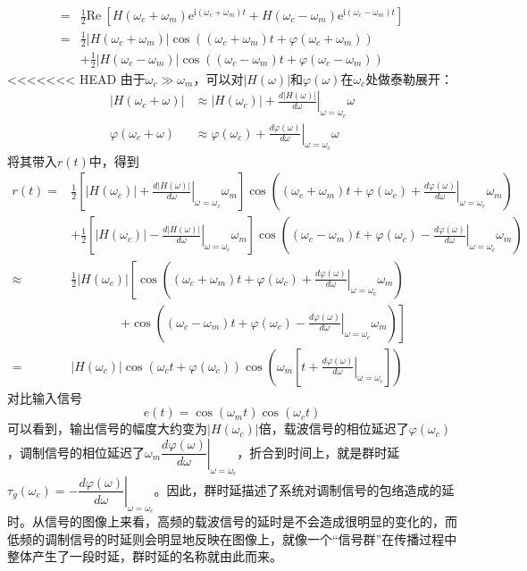 \begin{example}[群时延]
\begin{align*}
    =&\frac{1}{2}\text{Re}\ \left[H(\omega_c+\omega_m)\mathrm{e}^{\mathrm{i}(\omega_c+\omega_m)t}+H(\omega_c-\omega_m)\mathrm{e}^{\mathrm{i}(\omega_c-\omega_m)t}\right]\\
    =&\frac{1}{2}|H(\omega_c+\omega_m)|\cos((\omega_c+\omega_m)t+\varphi(\omega_c+\omega_m))\\
    &+\frac{1}{2}\left|H(\omega_c-\omega_m)\right|\cos\left((\omega_c-\omega_m)t+\varphi(\omega_c-\omega_m)\right)
\end{align*}
<<<<<<< HEAD
由于$\omega_c\gg \omega_m$，可以对$|H(\omega)|$和$\varphi(\omega)$在$\omega_c$处做泰勒展开：
\begin{align*}
    |H(\omega_c+\omega)|&\approx |H(\omega_c)|+\left.\frac{d|H(\omega)|}{d\omega}\right|_{\omega=\omega_c}\omega\\
    \varphi(\omega_c+ \omega)&\approx \varphi(\omega_c)+\left.\frac{d\varphi(\omega)}{d\omega}\right|_{\omega=\omega_c}\omega
\end{align*}
将其带入$r(t)$中，得到
\begin{align*}
    r(t)=&\frac{1}{2}\left[|H(\omega_c)|+\left.\frac{d|H(\omega)|}{d\omega}\right|_{\omega=\omega_c}\omega_m\right]\cos\left((\omega_c+\omega_m)t+\varphi(\omega_c)+\left.\frac{d\varphi(\omega)}{d\omega}\right|_{\omega=\omega_c}\omega_m\right)\\
    &+\frac{1}{2}\left[|H(\omega_c)|-\left.\frac{d|H(\omega)|}{d\omega}\right|_{\omega=\omega_c}\omega_m\right]\cos\left((\omega_c-\omega_m)t+\varphi(\omega_c)-\left.\frac{d\varphi(\omega)}{d\omega}\right|_{\omega=\omega_c}\omega_m\right)\\
    \approx&\frac{1}{2}|H(\omega_c)|\left[\cos\left((\omega_c+\omega_m)t+\varphi(\omega_c)+\left.\frac{d\varphi(\omega)}{d\omega}\right|_{\omega=\omega_c}\omega_m\right)\right.\\
    &\qquad\qquad\left.+\cos\left((\omega_c-\omega_m)t+\varphi(\omega_c)-\left.\frac{d\varphi(\omega)}{d\omega}\right|_{\omega=\omega_c}\omega_m\right)\right]\\
    =&|H(\omega_c)|\cos(\omega_c t+\varphi(\omega_c))\cos\left(\omega_m\left[t+\left.\frac{d\varphi(\omega)}{d\omega}\right|_{\omega=\omega_c}\right]\right)
\end{align*}
对比输入信号
\[e(t)=\cos(\omega_m t)\cos(\omega_c t)\]
可以看到，输出信号的幅度大约变为$|H(\omega_c)|$倍，载波信号的相位延迟了$\varphi(\omega_c)$，调制信号的相位延迟了$\omega_m\left.\dfrac{d\varphi(\omega)}{d\omega}\right|_{\omega=\omega_c}$，折合到时间上，就是群时延$\tau_g(\omega_c)=-\left.\dfrac{d\varphi(\omega)}{d\omega}\right|_{\omega=\omega_c}$。因此，群时延描述了系统对调制信号的包络造成的延时。从信号的图像上来看，高频的载波信号的延时是不会造成很明显的变化的，而低频的调制信号的时延则会明显地反映在图像上，就像一个“信号群”在传播过程中整体产生了一段时延，群时延的名称就由此而来。
\end{example}

